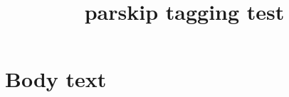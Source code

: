 \documentclass{article}
\title{parskip tagging test}
\begin{document}
\section{Body text}

\kant[1-3]
\end{document}
